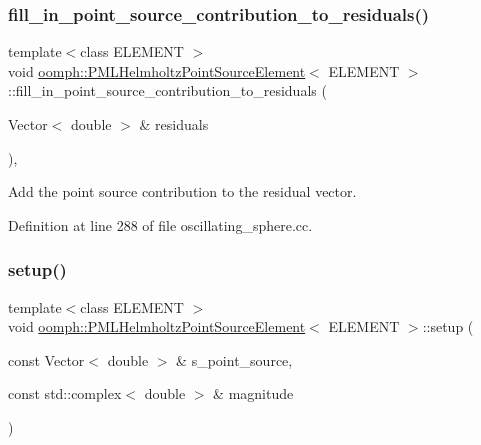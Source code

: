 \subsubsection{\texorpdfstring{fill\+\_\+in\+\_\+point\+\_\+source\+\_\+contribution\+\_\+to\+\_\+residuals()}{fill\_in\_point\_source\_contribution\_to\_residuals()}}
{\footnotesize\ttfamily template$<$class E\+L\+E\+M\+E\+NT $>$ \\
void \hyperlink{classoomph_1_1PMLHelmholtzPointSourceElement}{oomph\+::\+P\+M\+L\+Helmholtz\+Point\+Source\+Element}$<$ E\+L\+E\+M\+E\+NT $>$\+::fill\+\_\+in\+\_\+point\+\_\+source\+\_\+contribution\+\_\+to\+\_\+residuals (\begin{DoxyParamCaption}\item[{Vector$<$ double $>$ \&}]{residuals }\end{DoxyParamCaption})\hspace{0.3cm}{\ttfamily [inline]}, {\ttfamily [private]}}



Add the point source contribution to the residual vector. 



Definition at line 288 of file oscillating\+\_\+sphere.\+cc.

\mbox{\label{classoomph_1_1PMLHelmholtzPointSourceElement_ad8a39b19e2387c97d46dd656f54e4cda}} 
\subsubsection{\texorpdfstring{setup()}{setup()}}
{\footnotesize\ttfamily template$<$class E\+L\+E\+M\+E\+NT $>$ \\
void \hyperlink{classoomph_1_1PMLHelmholtzPointSourceElement}{oomph\+::\+P\+M\+L\+Helmholtz\+Point\+Source\+Element}$<$ E\+L\+E\+M\+E\+NT $>$\+::setup (\begin{DoxyParamCaption}\item[{const Vector$<$ double $>$ \&}]{s\+\_\+point\+\_\+source,  }\item[{const std\+::complex$<$ double $>$ \&}]{magnitude }\end{DoxyParamCaption})\hspace{0.3cm}{\ttfamily [inline]}}



